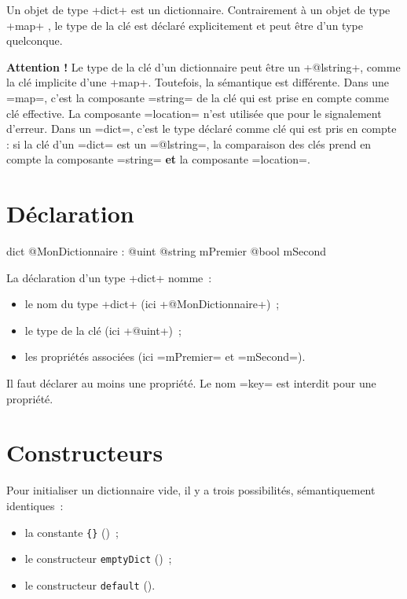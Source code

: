

Un objet de type \ggs+dict+ est un dictionnaire. Contrairement à un objet de type \ggs+map+ , le type de la clé est déclaré explicitement et peut être d'un type quelconque.

{\bf\color{red} Attention ! } Le type de la clé d'un dictionnaire peut être un \ggs+@lstring+, comme la clé implicite d'une \ggs+map+. Toutefois, la sémantique est différente. Dans une \ggs=map=, c'est la composante \ggs=string= de la clé qui est prise en compte comme clé effective. La composante \ggs=location= n'est utilisée que pour le signalement d'erreur. Dans un \ggs=dict=, c'est le type déclaré comme clé qui est pris en compte : si la clé d'un \ggs=dict= est un \ggs=@lstring=, la comparaison des clés prend en compte la composante \ggs=string= {\bf et} la composante \ggs=location=.

\section{Déclaration}

\begin{galgas}
dict @MonDictionnaire : @uint {
  @string mPremier
  @bool mSecond
}
\end{galgas}

La déclaration d'un type \ggs+dict+ nomme~:
\begin{itemize}
  \item le nom du type \ggs+dict+ (ici \ggs+@MonDictionnaire+)~;
  \item le type de la clé (ici \ggs+@uint+)~;
  \item les propriétés associées (ici \ggs=mPremier= et \ggs=mSecond=).
\end{itemize}

Il faut déclarer au moins une propriété. Le nom \ggs=key= est interdit pour une propriété.







\section{Constructeurs}

Pour initialiser un dictionnaire vide, il y a trois possibilités, sémantiquement identiques~:
\begin{itemize}
  \item la constante \texttt{\{\}} ()~; 
  \item le constructeur \texttt{emptyDict} ()~; 
  \item le constructeur \texttt{default} (). 
\end{itemize}


